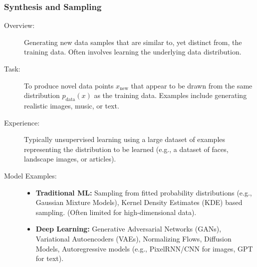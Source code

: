 \documentclass{article}
\begin{document}
\subsubsection{Synthesis and Sampling}
\begin{description}
    \item[Overview:] Generating new data samples that are similar to, yet distinct from, the training data. Often involves learning the underlying data distribution.
    \item[Task:] To produce novel data points $x_{\text{new}}$ that appear to be drawn from the same distribution $p_{\text{data}}(x)$ as the training data. Examples include generating realistic images, music, or text.
    \item[Experience:] Typically unsupervised learning using a large dataset of examples representing the distribution to be learned (e.g., a dataset of faces, landscape images, or articles).
    \item[Model Examples:]
        \begin{itemize}
            \item \textbf{Traditional ML:} Sampling from fitted probability distributions (e.g., Gaussian Mixture Models), Kernel Density Estimates (KDE) based sampling. (Often limited for high-dimensional data).
            \item \textbf{Deep Learning:} Generative Adversarial Networks (GANs), Variational Autoencoders (VAEs), Normalizing Flows, Diffusion Models, Autoregressive models (e.g., PixelRNN/CNN for images, GPT for text).
        \end{itemize}
\end{description}
\end{document}
